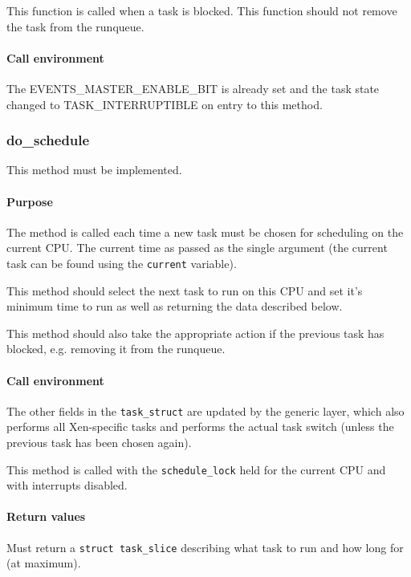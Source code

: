\documentclass[11pt,twoside,final,openright]{xenstyle}
\begin{document}
This function is called when a task is blocked.  This function should
not remove the task from the runqueue.

\paragraph*{Call environment}

The EVENTS\_MASTER\_ENABLE\_BIT is already set and the task state changed to
TASK\_INTERRUPTIBLE on entry to this method.

\subsubsection{do\_schedule}

This method must be implemented.

\paragraph*{Purpose}

The method is called each time a new task must be chosen for scheduling on the
current CPU.  The current time as passed as the single argument (the current
task can be found using the {\tt current} variable).

This method should select the next task to run on this CPU and set it's minimum
time to run as well as returning the data described below.

This method should also take the appropriate action if the previous
task has blocked, e.g. removing it from the runqueue.

\paragraph*{Call environment}

The other fields in the {\tt task\_struct} are updated by the generic layer,
which also performs all Xen-specific tasks and performs the actual task switch
(unless the previous task has been chosen again).

This method is called with the {\tt schedule\_lock} held for the current CPU
and with interrupts disabled.

\paragraph*{Return values}

Must return a {\tt struct task\_slice} describing what task to run and how long
for (at maximum).
\end{document}

